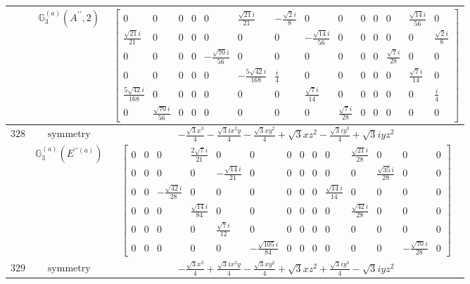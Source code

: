 \documentclass[fleqn,8pt,landscape]{jsarticle}
\begin{document}
\begin{longtable}{ccc}
$  $ & $ \mathbb{G}_{3}^{(a)}(A^{\prime\prime},2) $ & $ \begin{bmatrix} 0 & 0 & 0 & 0 & 0 & \frac{\sqrt{21} i}{21} & - \frac{\sqrt{2} i}{8} & 0 & 0 & 0 & 0 & 0 & \frac{\sqrt{14} i}{56} & 0 \\ \frac{\sqrt{21} i}{21} & 0 & 0 & 0 & 0 & 0 & 0 & - \frac{\sqrt{14} i}{56} & 0 & 0 & 0 & 0 & 0 & \frac{\sqrt{2} i}{8} \\ 0 & 0 & 0 & 0 & - \frac{\sqrt{70} i}{56} & 0 & 0 & 0 & 0 & 0 & 0 & \frac{\sqrt{7} i}{28} & 0 & 0 \\ 0 & 0 & 0 & 0 & 0 & - \frac{5 \sqrt{42} i}{168} & \frac{i}{4} & 0 & 0 & 0 & 0 & 0 & \frac{\sqrt{7} i}{14} & 0 \\ \frac{5 \sqrt{42} i}{168} & 0 & 0 & 0 & 0 & 0 & 0 & \frac{\sqrt{7} i}{14} & 0 & 0 & 0 & 0 & 0 & \frac{i}{4} \\ 0 & \frac{\sqrt{70} i}{56} & 0 & 0 & 0 & 0 & 0 & 0 & \frac{\sqrt{7} i}{28} & 0 & 0 & 0 & 0 & 0 \end{bmatrix} $ \\ \hline
$ 328 $ & $ \text{symmetry} $ & $ - \frac{\sqrt{3} x^{3}}{4} - \frac{\sqrt{3} i x^{2} y}{4} - \frac{\sqrt{3} x y^{2}}{4} + \sqrt{3} x z^{2} - \frac{\sqrt{3} i y^{3}}{4} + \sqrt{3} i y z^{2} $ \\
$  $ & $ \mathbb{G}_{3}^{(a)}(E^{\prime\prime(a)}) $ & $ \begin{bmatrix} 0 & 0 & 0 & \frac{2 \sqrt{7} i}{21} & 0 & 0 & 0 & 0 & 0 & 0 & \frac{\sqrt{21} i}{28} & 0 & 0 & 0 \\ 0 & 0 & 0 & 0 & - \frac{\sqrt{14} i}{21} & 0 & 0 & 0 & 0 & 0 & 0 & \frac{\sqrt{35} i}{28} & 0 & 0 \\ 0 & 0 & - \frac{\sqrt{42} i}{28} & 0 & 0 & 0 & 0 & 0 & 0 & \frac{\sqrt{14} i}{14} & 0 & 0 & 0 & 0 \\ 0 & 0 & 0 & \frac{\sqrt{14} i}{84} & 0 & 0 & 0 & 0 & 0 & 0 & \frac{\sqrt{42} i}{28} & 0 & 0 & 0 \\ 0 & 0 & 0 & 0 & \frac{\sqrt{7} i}{12} & 0 & 0 & 0 & 0 & 0 & 0 & 0 & 0 & 0 \\ 0 & 0 & 0 & 0 & 0 & - \frac{\sqrt{105} i}{84} & 0 & 0 & 0 & 0 & 0 & 0 & - \frac{\sqrt{70} i}{28} & 0 \end{bmatrix} $ \\ \hline
$ 329 $ & $ \text{symmetry} $ & $ - \frac{\sqrt{3} x^{3}}{4} + \frac{\sqrt{3} i x^{2} y}{4} - \frac{\sqrt{3} x y^{2}}{4} + \sqrt{3} x z^{2} + \frac{\sqrt{3} i y^{3}}{4} - \sqrt{3} i y z^{2} $ \\

\end{longtable}
\end{document}
